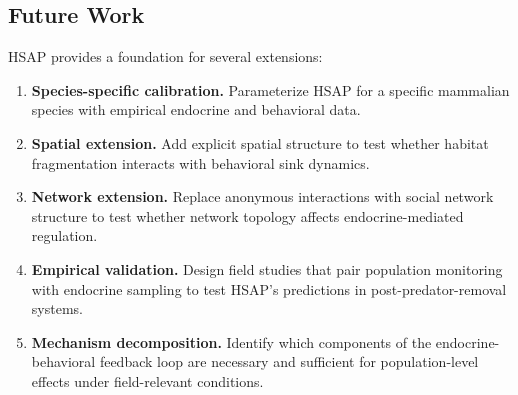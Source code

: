 \subsection{Future Work}

HSAP provides a foundation for several extensions:

\begin{enumerate}
\item \textbf{Species-specific calibration.} Parameterize HSAP for a specific mammalian species with empirical endocrine and behavioral data.

\item \textbf{Spatial extension.} Add explicit spatial structure to test whether habitat fragmentation interacts with behavioral sink dynamics.

\item \textbf{Network extension.} Replace anonymous interactions with social network structure to test whether network topology affects endocrine-mediated regulation.

\item \textbf{Empirical validation.} Design field studies that pair population monitoring with endocrine sampling to test HSAP's predictions in post-predator-removal systems.

\item \textbf{Mechanism decomposition.} Identify which components of the endocrine-behavioral feedback loop are necessary and sufficient for population-level effects under field-relevant conditions.
\end{enumerate}
